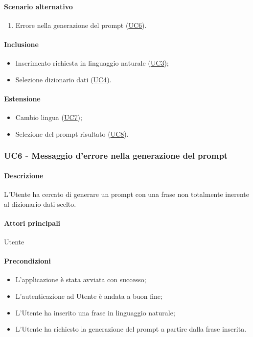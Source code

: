 \paragraph*{Scenario alternativo}
\begin{enumerate}
  \item Errore nella generazione del prompt (\hyperref[UC6]{UC6}).
\end{enumerate}

\paragraph*{Inclusione}
\begin{itemize}
  \item Inserimento richiesta in linguaggio naturale (\hyperref[UC3]{UC3});
  \item Selezione dizionario dati (\hyperref[UC4]{UC4}).
\end{itemize}

\paragraph*{Estensione}
\begin{itemize}
  \item Cambio lingua (\hyperref[UC7]{UC7});
  \item Selezione del prompt risultato (\hyperref[UC8]{UC8}).
\end{itemize}


\subsubsection{UC6 - Messaggio d'errore nella generazione del prompt}\label{UC6}

\paragraph*{Descrizione}
L’Utente ha cercato di generare un prompt con una frase non totalmente inerente al dizionario dati scelto.

\paragraph*{Attori principali} Utente

\paragraph*{Precondizioni}
\begin{itemize}
  \item L'applicazione è stata avviata con successo;
  \item L’autenticazione ad Utente è andata a buon fine;
  \item L’Utente ha inserito una frase in linguaggio naturale;
  \item L’Utente ha richiesto la generazione del prompt a partire dalla frase inserita.  
\end{itemize}

